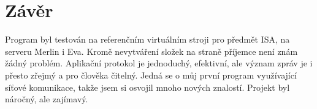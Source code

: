 \documentclass[11pt,a4paper]{article}
\begin{document}
\section{Závěr}
Program byl testován na referenčním virtuálním stroji pro předmět ISA, na serveru Merlin i Eva. Kromě nevytváření složek na straně příjemce není znám žádný problém. Aplikační protokol je jednoduchý, efektivní, ale význam zpráv je i přesto zřejmý a pro člověka čitelný.
Jedná se o můj první program využívající síťové komunikace, takže jsem si osvojil mnoho nových znalostí. Projekt byl náročný, ale zajímavý.
\end{document}
